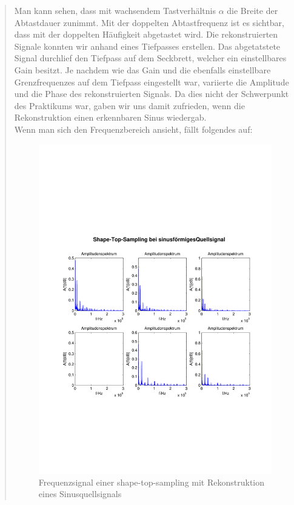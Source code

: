 \begin{quote}
  	    Man kann sehen, dass mit wachsendem Tastverhältnis $\alpha$ die Breite
  	    der Abtastdauer zunimmt. Mit der doppelten Abtastfrequenz ist es
  	    sichtbar, dass mit der doppelten Häufigkeit abgetastet wird. Die
  	    rekonstruierten Signale konnten wir anhand eines Tiefpasses erstellen.
  	    Das abgetatstete Signal durchlief den Tiefpass auf dem Seckbrett,
  	    welcher ein einstellbares Gain besitzt. Je nachdem wie das Gain und die
  	    ebenfalls einstellbare Grenzfrequenzes auf dem Tiefpass eingestellt
  	    war, variierte die Amplitude und die Phase des rekonstruierten Signals.
  	    Da dies nicht der Schwerpunkt des Praktikums war, gaben wir uns damit
  	    zufrieden, wenn die Rekonstruktion einen erkennbaren Sinus wiedergab.\\
  	    
  	    Wenn man sich den Frequenzbereich ansieht, fällt folgendes auf:
  	    
  	    
    	\begin{figure}[H]
    \centering
        \includegraphics[scale=0.7, trim = 0cm 0cm 0cm 0cm,
        clip]{./Bilder/shape-top-sinus_freq}
            \caption{Frequenzsignal einer shape-top-sampling mit Rekonstruktion
            eines Sinusquellsignals}
  	    \end{figure}
  	    

\end{quote}
